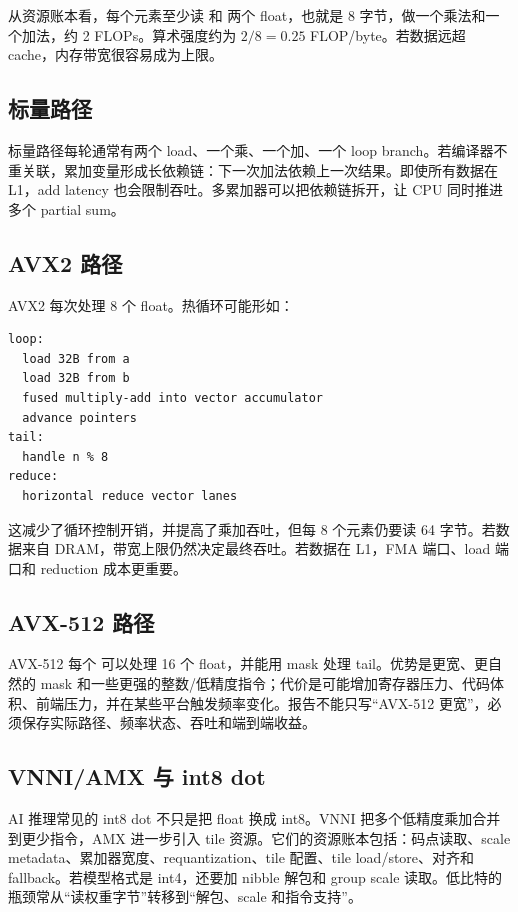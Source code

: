 从资源账本看，每个元素至少读  和  两个 float，也就是 8 字节，做一个乘法和一个加法，约 2 FLOPs。算术强度约为 \(2 / 8 = 0.25\) FLOP/byte。若数据远超 cache，内存带宽很容易成为上限。

\subsection{标量路径}

标量路径每轮通常有两个 load、一个乘、一个加、一个 loop branch。若编译器不重关联，累加变量形成长依赖链：下一次加法依赖上一次结果。即使所有数据在 L1，add latency 也会限制吞吐。多累加器可以把依赖链拆开，让 CPU 同时推进多个 partial sum。

\subsection{AVX2 路径}

AVX2 每次处理 8 个 float。热循环可能形如：

\begin{lstlisting}[numbers=none,caption={AVX2 dot 的资源账本形态}]
loop:
  load 32B from a
  load 32B from b
  fused multiply-add into vector accumulator
  advance pointers
tail:
  handle n % 8
reduce:
  horizontal reduce vector lanes
\end{lstlisting}

这减少了循环控制开销，并提高了乘加吞吐，但每 8 个元素仍要读 64 字节。若数据来自 DRAM，带宽上限仍然决定最终吞吐。若数据在 L1，FMA 端口、load 端口和 reduction 成本更重要。

\subsection{AVX-512 路径}

AVX-512 每个  可以处理 16 个 float，并能用 mask 处理 tail。优势是更宽、更自然的 mask 和一些更强的整数/低精度指令；代价是可能增加寄存器压力、代码体积、前端压力，并在某些平台触发频率变化。报告不能只写“AVX-512 更宽”，必须保存实际路径、频率状态、吞吐和端到端收益。

\subsection{VNNI/AMX 与 int8 dot}

AI 推理常见的 int8 dot 不只是把 float 换成 int8。VNNI 把多个低精度乘加合并到更少指令，AMX 进一步引入 tile 资源。它们的资源账本包括：码点读取、scale metadata、累加器宽度、requantization、tile 配置、tile load/store、对齐和 fallback。若模型格式是 int4，还要加 nibble 解包和 group scale 读取。低比特的瓶颈常从“读权重字节”转移到“解包、scale 和指令支持”。

